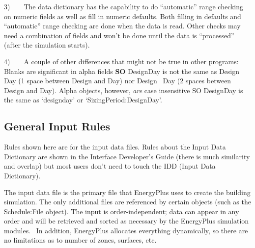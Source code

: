 3)~~~~The data dictionary has the capability to do ``automatic'' range checking on numeric fields as well as fill in numeric defaults. Both filling in defaults and ``automatic'' range checking are done when the data is read. Other checks may need a combination of fields and won't be done until the data is ``processed'' (after the simulation starts).

4)~~~~A couple of other differences that might not be true in other programs:~ Blanks are significant in alpha fields \textbf{SO} DesignDay is not the same as Design Day (1 space between Design and Day) nor Design~ Day (2 spaces between Design and Day). Alpha objects, however, \emph{are} case insensitive SO DesignDay is the same as `designday' or `SizingPeriod:DesignDay'.

\subsection{General Input Rules}\label{general-input-rules}

Rules shown here are for the input data files. Rules about the Input Data Dictionary are shown in the Interface Developer's Guide (there is much similarity and overlap) but most users don't need to touch the IDD (Input Data Dictionary).

The input data file is the primary file that EnergyPlus uses to create the building simulation. The only additional files are referenced by certain objects (such as the Schedule:File object). The input is order-independent; data can appear in any order and will be retrieved and sorted as necessary by the EnergyPlus simulation modules.~ In addition, EnergyPlus allocates everything dynamically, so there are no limitations as to number of zones, surfaces, etc.

